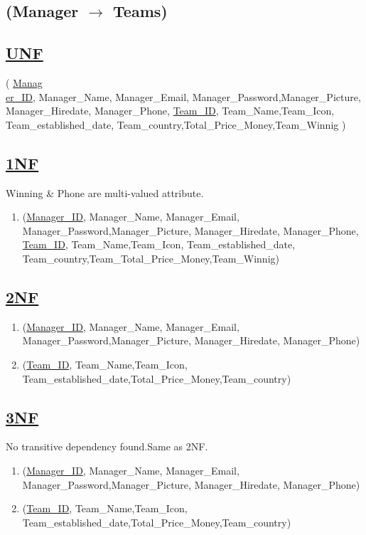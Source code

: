 \subsection{\texorpdfstring{\centering (Manager $\rightarrow$ Teams)}{ (Manager - Teams)}}

\subsection*{\underline{UNF}}

(
\underline{Manag\\er\_ID}, Manager\_Name, Manager\_Email, Manager\_Password,Manager\_Picture, Manager\_Hiredate, Manager\_Phone,
\underline{Team\_ID}, Team\_Name,Team\_Icon, Team\_established\_date, Team\_country,Total\_Price\_Money,Team\_Winnig
)

\subsection*{\underline{1NF}}

Winning \& Phone are multi-valued attribute.
\vskip 0.2in
\begin{enumerate}
    \item
          (\underline{Manager\_ID}, Manager\_Name, Manager\_Email, Manager\_Password,Manager\_Picture, Manager\_Hiredate, Manager\_Phone,
          \underline{Team\_ID}, Team\_Name,Team\_Icon, Team\_established\_date, Team\_country,Team\_Total\_Price\_Money,Team\_Winnig)
\end{enumerate}

\subsection*{\underline{2NF}}
\begin{enumerate}
    \item (\underline{Manager\_ID}, Manager\_Name, Manager\_Email, Manager\_Password,Manager\_Picture, Manager\_Hiredate, Manager\_Phone)
    \item (\underline{Team\_ID}, Team\_Name,Team\_Icon, Team\_established\_date,Total\_Price\_Money,Team\_country)
\end{enumerate}

\subsection*{\underline{3NF}}
No transitive dependency found.Same as 2NF.
\begin{enumerate}
    \item (\underline{Manager\_ID}, Manager\_Name, Manager\_Email, Manager\_Password,Manager\_Picture, Manager\_Hiredate, Manager\_Phone)
    \item (\underline{Team\_ID}, Team\_Name,Team\_Icon, Team\_established\_date,Total\_Price\_Money,Team\_country)
\end{enumerate}


